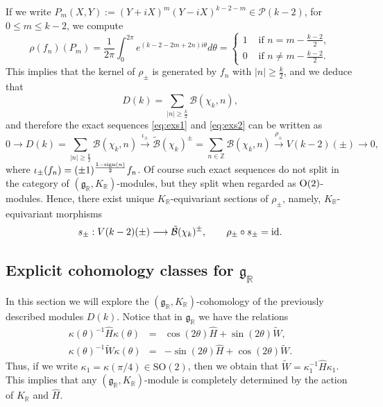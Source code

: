 \documentclass{amsart}
\theoremstyle{definition}
\theoremstyle{remark}
\numberwithin{equation}{section}
\newcommand{\SO}{{\mathrm {SO}}}
\newcommand{\Z}{{\mathbb Z}}
\newcommand{\R}{{\mathbb R}}
\newcommand{\cB}{{\mathcal B}}
\newcommand{\cP}{{\mathcal P}}
\newcommand{\mfg}{{\mathfrak g}}
\begin{document}
If we write $P_m(X,Y):=(Y+iX)^{m}(Y-iX)^{k-2-m}\in\cP(k-2)$, for $0\leq m\leq k-2$, we compute
\begin{equation}\label{norm1}
\rho(f_n)(P_m)=\frac{1}{2\pi}\int_{0}^{2\pi}e^{(k-2-2m+2n)i\theta} d\theta=\left\{\begin{array}{ll}1 &\text{ if } n=m-\frac{k-2}{2},\\0& \text{ if }n\neq m-\frac{k-2}{2}.\end{array}\right.
\end{equation}
This implies that the kernel of $\rho_\pm$ is generated by $f_n$ with $|n|\geq\frac{k}{2}$, and we deduce that
\[
D(k)=\sum_{|n|\geq \frac{k}{2}}\cB(\chi_k,n),
\]
and therefore the exact sequences \eqref{eq:exs1} and \eqref{eq:exs2} can be written as 
\begin{equation}\label{exseq1}
0\longrightarrow D(k)=\sum_{|n|\geq \frac{k}{2}}\cB(\chi_k,n)\stackrel{\iota_\pm}{\longrightarrow} \tilde \cB(\chi_k)^\pm=\sum_{n\in \Z}\cB(\chi_k,n) \stackrel{\rho_\pm}{\longrightarrow} V(k-2)(\pm)\longrightarrow 0,
\end{equation}
where $\iota_\pm(f_n)=(\pm 1)^{\frac{1-{\rm sign}(n)}{2}}f_n$.
Of course such exact sequences do not split in the category of $(\mfg_\R,K_\R)$-modules, but they split when regarded as ${\rm O}(2)$-modules. Hence, there exist unique $K_\R$-equivariant sections of $\rho_\pm$, namely, $K_\R$-equivariant morphisms  
\[
s_\pm:V(k-2)(\pm)\longrightarrow \tilde\cB(\chi_k)^\pm,\qquad \rho_\pm\circ s_\pm={\rm id}.
\]

\subsection{Explicit cohomology classes for $\mfg_\R$}\label{ExpliCCR}
   In this section we will explore the $(\mfg_\R,K_\R)$-cohomology of the previously described modules $D(k)$. Notice that  in $\mfg_\R$ we have the relations
    \begin{eqnarray}\label{relGK}
        \kappa(\theta)^{-1}\hat H\kappa(\theta)&=&\cos(2\theta)\hat H+\sin(2\theta)\tilde W,\\
        \kappa(\theta)^{-1}\tilde W\kappa(\theta)&=&-\sin(2\theta)\hat H+\cos(2\theta)\tilde W.
    \end{eqnarray}
    Thus, if we write $\kappa_1=\kappa(\pi/4)\in \SO(2)$, then we obtain that
    $\tilde W=\kappa_1^{-1}\hat H\kappa_1$.
    This implies that any $(\mfg_\R,K_\R)$-module is completely determined by the action of $K_\R$ and $\hat H$.
\end{document}
